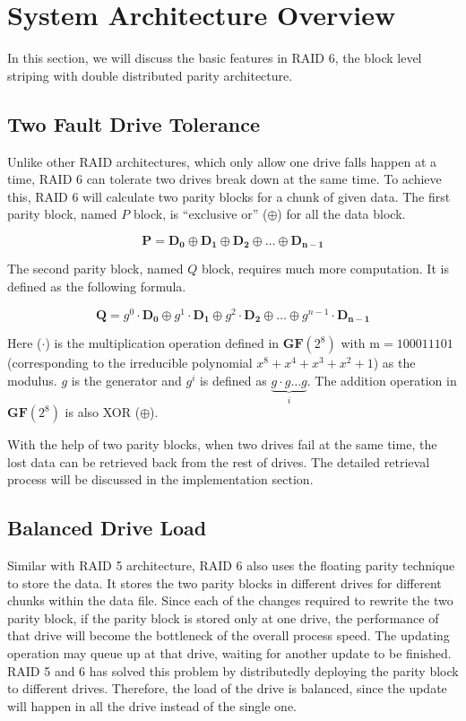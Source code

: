 \section{System Architecture Overview}

In this section, we will discuss the basic features in RAID 6, the block level striping with double distributed parity architecture.

\subsection{Two Fault Drive Tolerance}
Unlike other RAID architectures, which only allow one drive falls happen at a time, RAID 6 can tolerate two drives break down at the same time. To achieve this, RAID 6 will calculate two parity blocks for a chunk of given data. The first parity block, named $P$ block, is  ``exclusive or'' ($\oplus$) for all the data block. 

\begin{equation}\label{eq:gen_p}
	\mathbf{P = D_0 \oplus D_1 \oplus D_2 \oplus \ldots \oplus D_{n-1}}
\end{equation}

The second parity block, named $Q$ block, requires much more computation. It is defined as the following formula.

\begin{equation}\label{eq:gen_q}
	\mathbf{Q} = g^0\cdot \mathbf{D_0} \oplus g^1\cdot \mathbf{D_1} \oplus g^2\cdot \mathbf{D_2} \oplus \ldots \oplus g^{n-1}\cdot \mathbf{D_{n-1}}
\end{equation}

Here ($\cdot$) is the multiplication operation defined in $\mathbf{GF}(2^8)$ with $\mathrm{m}=100011101$ (corresponding to the irreducible polynomial $x^8+x^4+x^3+x^2+1$) as the modulus. $g$ is the generator and $g^{i}$ is defined as $\underbrace{g\cdot g\ldots g}_{i}$. The addition operation in $\mathbf{GF}(2^8)$ is also XOR ($\oplus$).

With the help of two parity blocks, when two drives fail at the same time, the lost data can be retrieved back from the rest of drives. The detailed retrieval process will be discussed in the implementation section.


\subsection{Balanced Drive Load}
Similar with RAID 5 architecture, RAID 6 also uses the floating parity technique to store the data. It stores the two parity blocks in different drives for different chunks within the data file. Since each of the changes required to rewrite the two parity block, if the parity block is stored only at one drive, the performance of that drive will become the bottleneck of the overall process speed. The updating operation may queue up at that drive, waiting for another update to be finished. RAID 5 and 6 has solved this problem by distributedly deploying the parity block to different drives. Therefore, the load of the drive is balanced, since the update will happen in all the drive instead of the single one.

